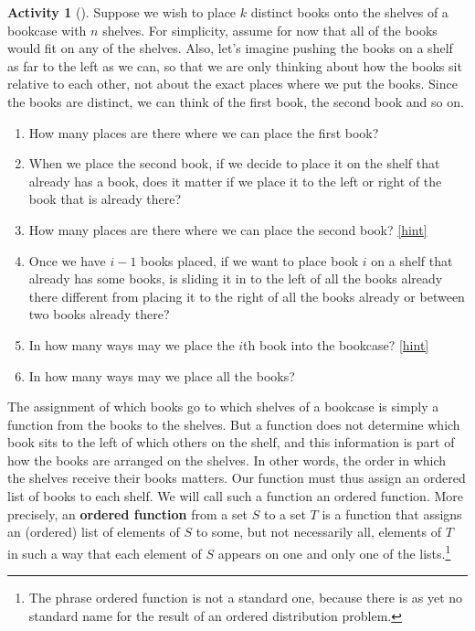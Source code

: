 \documentclass[10pt,]{book}
\newcommand{\terminology}[1]{\textbf{#1}}
\theoremstyle{plain}
\theoremstyle{definition}
\theoremstyle{definition}
\theoremstyle{definition}
\newtheorem{activity}[project]{Activity}
\numberwithin{equation}{chapter}
\begin{document}
\begin{activity}[]\label{bookcase}
\hypertarget{p-825}{}%
Suppose we wish to place \(k\) distinct books onto the shelves of a bookcase with \(n\) shelves. For simplicity, assume for now that all of the books would fit on any of the shelves. Also, let's imagine pushing the books on a shelf as far to the left as we can, so that we are only thinking about how the books sit relative to each other, not about the exact places where we put the books. Since the books are distinct, we can think of the first book, the second book and so on.%
\begin{enumerate}[font=\bfseries,label=(\alph*),ref=\alph*]
\item\label{task-161} \hypertarget{p-826}{}%
How many places are there where we can place the first book?%
\item\label{task-162} \hypertarget{p-828}{}%
When we place the second book, if we decide to place it on the shelf that already has a book, does it matter if we place it to the left or right of the book that is already there?%
\item\label{task-163} \hypertarget{p-830}{}%
How many places are there where we can place the second book?%
\hfill{\tiny\hyperlink{a-124.c}{[hint]}\hypertarget{q-124.c}{}}\item\label{task-164} \hypertarget{p-833}{}%
Once we have \(i-1\) books placed, if we want to place book \(i\)  on a shelf that already has some books, is sliding it in to the left of all the books already there different from placing it to the right of all the books already or between two books already there?%
\item\label{task-165} \hypertarget{p-835}{}%
In how many ways may we place the \(i\)th book into the bookcase?%
\hfill{\tiny\hyperlink{a-124.e}{[hint]}\hypertarget{q-124.e}{}}\item\label{task-166} \hypertarget{p-838}{}%
In how many ways may we place all the books?%
\end{enumerate}
\end{activity}
\hypertarget{p-840}{}%
The assignment of which books go to which shelves of a bookcase is simply a function from the books to the shelves. But a function does not determine which book sits to the left of which others on the shelf, and this information is part of how the books are arranged on the shelves. In other words, the order in which the shelves receive their books matters.  Our function must thus assign an ordered list of books to each shelf. We will call such a function an ordered function. More precisely, an \terminology{ordered function} from a set \(S\) to a set \(T\) is a function that assigns an (ordered) list of elements of \(S\) to some, but not necessarily all, elements of \(T\) in such a way that each element of \(S\) appears on one and only one of the lists.\footnote{The phrase ordered function is not a standard one, because there is as yet no standard name for the result of an ordered distribution problem.\label{fn-10}}%
\end{document}
